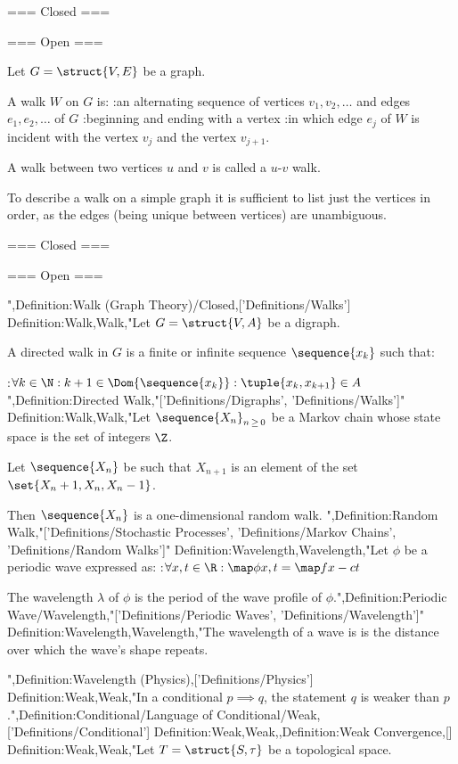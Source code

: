 === Closed ===

=== Open ===

Let $G = \struct {V, E}$ be a graph.

A walk $W$ on $G$ is:
:an alternating sequence of vertices $v_1, v_2, \ldots$ and edges $e_1, e_2, \ldots$ of $G$
:beginning and ending with a vertex
:in which edge $e_j$ of $W$ is incident with the vertex $v_j$ and the vertex $v_{j + 1}$.


A walk between two vertices $u$ and $v$ is called a $u$-$v$ walk.


To describe a walk on a simple graph it is sufficient to list just the vertices in order, as the edges (being unique between vertices) are unambiguous.


=== Closed ===

=== Open ===

",Definition:Walk (Graph Theory)/Closed,['Definitions/Walks']
Definition:Walk,Walk,"Let $G = \struct {V, A}$ be a digraph.


A directed walk in $G$ is a finite or infinite sequence $\sequence {x_k}$ such that:

:$\forall k \in \N: k + 1 \in \Dom {\sequence {x_k} }: \tuple {x_k, x_{k + 1} } \in A$
",Definition:Directed Walk,"['Definitions/Digraphs', 'Definitions/Walks']"
Definition:Walk,Walk,"Let $\sequence {X_n}_{n \mathop \ge 0}$ be a Markov chain whose state space is the set of integers $\Z$.

Let $\sequence {X_n}$ be such that $X_{n + 1}$ is an element of the set $\set {X_n + 1, X_n, X_n - 1}$.

Then $\sequence {X_n}$ is a one-dimensional random walk.
",Definition:Random Walk,"['Definitions/Stochastic Processes', 'Definitions/Markov Chains', 'Definitions/Random Walks']"
Definition:Wavelength,Wavelength,"Let $\phi$ be a periodic wave expressed as:
:$\forall x, t \in \R: \map \phi {x, t} = \map f {x - c t}$


The wavelength $\lambda$ of $\phi$ is the period of the wave profile of $\phi$.",Definition:Periodic Wave/Wavelength,"['Definitions/Periodic Waves', 'Definitions/Wavelength']"
Definition:Wavelength,Wavelength,"The wavelength of a wave is is the distance over which the wave's shape repeats.


",Definition:Wavelength (Physics),['Definitions/Physics']
Definition:Weak,Weak,"In a conditional $p \implies q$, the statement $q$ is weaker than $p$.",Definition:Conditional/Language of Conditional/Weak,['Definitions/Conditional']
Definition:Weak,Weak,,Definition:Weak Convergence,[]
Definition:Weak,Weak,"Let $T = \struct {S, \tau}$ be a topological space.


